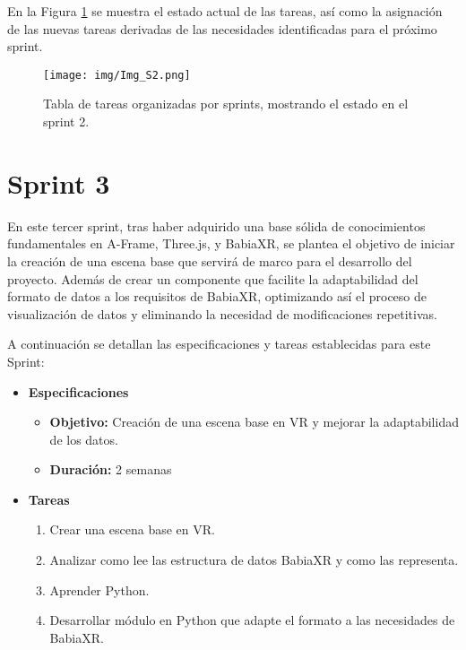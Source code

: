 \documentclass[a4paper, 12pt]{book}
\begin{document}
En la Figura \ref{fig:Img_S1} se muestra el estado actual de las tareas, así como la asignación de las nuevas tareas derivadas de las necesidades identificadas para el próximo sprint.   
\begin{figure}[H]
    \centering
    \texttt{[image: img/Img\_S2.png]}
    \caption{\footnotesize Tabla de tareas organizadas por sprints, mostrando el estado en el sprint 2.}
    \label{fig:Img_S1}
\end{figure}    
            



    
    \newpage
    \section{Sprint 3} 

        En este tercer sprint, tras haber adquirido una base sólida de conocimientos fundamentales en A-Frame, Three.js, y BabiaXR, se plantea el objetivo de iniciar la creación de una escena base que servirá de marco para el desarrollo del proyecto. Además de crear un componente que facilite la adaptabilidad del formato de datos a los requisitos de BabiaXR, optimizando así el proceso de visualización de datos y eliminando la necesidad de modificaciones repetitivas.
   
    A continuación se detallan las especificaciones y tareas establecidas para este Sprint:
        \begin{itemize}
            \item \textbf{Especificaciones}
            \begin{itemize}
                \item \textbf{Objetivo:} Creación de una escena base en VR y mejorar la adaptabilidad de los datos.
                \item \textbf{Duración:} 2 semanas

            \end{itemize}
            
            \item \textbf{Tareas}
            \begin{enumerate}
                \item Crear una escena base en VR.
                \item Analizar como lee las estructura de datos BabiaXR y como las representa.
                \item Aprender Python.
                \item Desarrollar módulo en Python que adapte el formato a las necesidades de BabiaXR.
            \end{enumerate}
\end{itemize}
\end{document}
